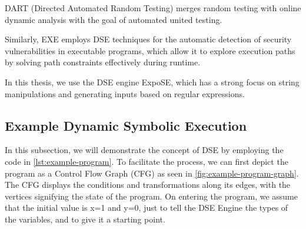 DART (Directed Automated Random Testing) merges random testing with online dynamic analysis with the goal of automated united testing.

Similarly, EXE employs DSE techniques for the automatic detection of security vulnerabilities in executable programs, which allow it to explore execution paths by solving path constraints effectively during runtime.

In this thesis, we use the DSE engine ExpoSE, which has a strong focus on string manipulations and generating inputs based on regular expressions. 




\subsection{Example Dynamic Symbolic Execution}
In this subsection, we will demonstrate the concept of DSE by employing the code in \autoref{lst:example-program}. 
To facilitate the process, we can first depict the program as a Control Flow Graph (CFG) as seen in \autoref{fig:example-program-graph}. 
The CFG displays the conditions and transformations along its edges, with the vertices signifying the state of the program.
On entering  the program, we assume that the initial value is x=1 and y=0, just to tell the DSE Engine the types of the variables, and to give it a starting point. 


